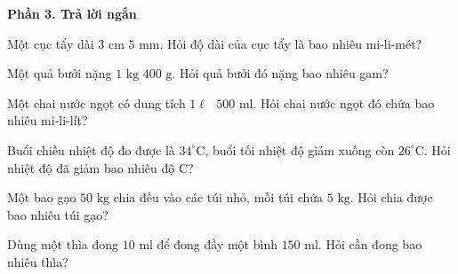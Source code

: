 \textbf{Phần 3. Trả lời ngắn}

\begin{ex} %
Một cục tẩy dài $3\text{ cm } 5\text{ mm}$. Hỏi độ dài của cục tẩy là bao nhiêu mi-li-mét?
\end{ex}

\begin{ex} %
Một quả bưởi nặng $1\text{ kg } 400\text{ g}$. Hỏi quả bưởi đó nặng bao nhiêu gam?
\end{ex}

\begin{ex} %
Một chai nước ngọt có dung tích $1\ell\text{ }500\text{ ml}$. Hỏi chai nước ngọt đó chứa bao nhiêu mi-li-lít?
\end{ex}

\begin{ex} %
Buổi chiều nhiệt độ đo được là $34^\circ\text{C}$, buổi tối nhiệt độ giảm xuống còn $26^\circ\text{C}$. Hỏi nhiệt độ đã giảm bao nhiêu độ C?
\end{ex}

\begin{ex} %
Một bao gạo $50\text{ kg}$ chia đều vào các túi nhỏ, mỗi túi chứa $5\text{ kg}$. Hỏi chia được bao nhiêu túi gạo?
\end{ex}

\begin{ex} %
Dùng một thìa đong $10\text{ ml}$ để đong đầy một bình $150\text{ ml}$. Hỏi cần đong bao nhiêu thìa?
\end{ex}

